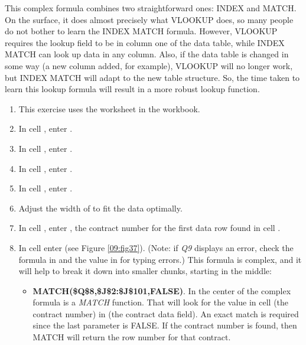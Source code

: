 This complex formula combines two straightforward ones: INDEX and MATCH. On the surface, it does almost precisely what VLOOKUP does, so many people do not bother to learn the INDEX MATCH formula. However, VLOOKUP requires the lookup field to be in column one of the data table, while INDEX MATCH can look up data in any column. Also, if the data table is changed in some way (a new column added, for example), VLOOKUP will no longer work, but INDEX MATCH will adapt to the new table structure. So, the time taken to learn this lookup formula will result in a more robust lookup function.

\begin{enumbox}
	\begin{enumerate}
		\item This exercise uses the  worksheet in the  workbook.
		\item In cell , enter .
		\item In cell , enter .
		\item In cell , enter .
		\item In cell , enter .
		\item Adjust the width of  to fit the data optimally.
		\item In cell , enter , the contract number for the first data row found in cell .

		\item In cell  enter  (see Figure \ref{09:fig37}). (Note: if \textit{Q9} displays an error, check the formula in  and the value in  for typing errors.) This formula is complex, and it will help to break it down into smaller chunks, starting in the middle: 
		
		\begin{itemize}
			\item \textbf{MATCH(\$Q\$8,\$J\$2:\$J\$101,FALSE)}. In the center of the complex formula is a \textit{MATCH} function. That will look for the value in cell  (the contract number) in  (the contract data field). An exact match is required since the last parameter is FALSE. If the contract number is found, then MATCH will return the row number for that contract.


\end{itemize}
\end{enumerate}
\end{enumbox}
